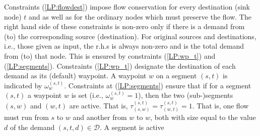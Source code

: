 \documentclass[a4paper,USenglish]{article}
\begin{document}
Constraints (\ref{LP:flowdest}) impose flow conservation for every destination (sink node) $t$
and as well as for the ordinary  nodes which must preserve the flow.
The right hand side of these constraints is non-zero only if there is a demand from (to) the corresponding source (destination). For original sources and destinations, i.e., those given as input, 
the r.h.s is always non-zero and is the total  demand from (to) that node.
This is ensured by constraints (\ref{LP:wp_t}) and  (\ref{LP:segments}).
 Constraints (\ref{LP:wp_t}) designate the destination of each demand as its (default) waypoint.
 A waypoint $w$  on a segment $(s,t)$ is indicated by $\omega^{(s,t)}_{w}$.
Constraints at (\ref{LP:segments}) ensure that if for a segment $(s,t)$
a waypoint $w$ is set (i.e., $\omega^{(s,t)}_{w}=1$),
then the two (sub-)segments $(s,w)$ and $(w,t)$ are active.
That is,
$\tau^{(s,t)}_{(s,w)} = \tau^{(s,t)}_{(w,t)} = 1$.
That is, one flow must run from $s$ to $w$ and another from $w$ to $w$, both with size equal to the value $d$ of the demand $(s,t,d) \in \mathcal{D}$.
A segment is active 
\end{document}
